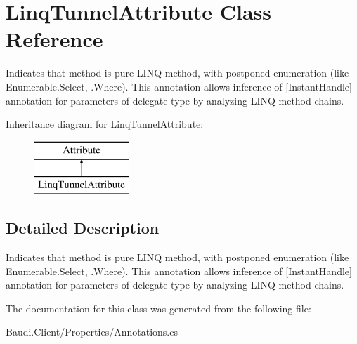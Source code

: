 \hypertarget{class_linq_tunnel_attribute}{}\section{Linq\+Tunnel\+Attribute Class Reference}
\label{class_linq_tunnel_attribute}


Indicates that method is pure L\+I\+N\+Q method, with postponed enumeration (like Enumerable.\+Select, .Where). This annotation allows inference of \mbox{[}Instant\+Handle\mbox{]} annotation for parameters of delegate type by analyzing L\+I\+N\+Q method chains.  


Inheritance diagram for Linq\+Tunnel\+Attribute\+:\begin{figure}[H]
\begin{center}
\leavevmode
\includegraphics[height=2.000000cm]{class_linq_tunnel_attribute}
\end{center}
\end{figure}


\subsection{Detailed Description}
Indicates that method is pure L\+I\+N\+Q method, with postponed enumeration (like Enumerable.\+Select, .Where). This annotation allows inference of \mbox{[}Instant\+Handle\mbox{]} annotation for parameters of delegate type by analyzing L\+I\+N\+Q method chains. 



The documentation for this class was generated from the following file\+:\begin{DoxyCompactItemize}
\item 
Baudi.\+Client/\+Properties/Annotations.\+cs\end{DoxyCompactItemize}
